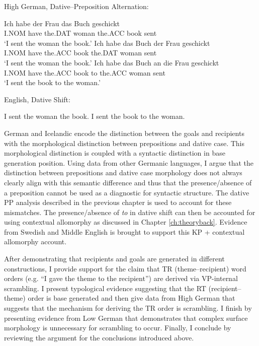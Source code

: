\begin{exe}
	\ex High German, Dative--Preposition Alternation: \label{ex:german-forms}
	\begin{xlist}
		 \ex \label{ex:german-1} \gll Ich habe der Frau das Buch geschickt\\
		 	 I.NOM have the.DAT woman the.ACC book sent\\
			 \trans `I sent the woman the book.'
		 \ex \label{ex:german-2} \gll Ich habe das Buch der Frau geschickt\\
			 I.NOM have the.ACC book the.DAT woman sent\\
			 \trans `I sent the woman the book.'
		 \ex \label{ex:german-3} \gll Ich habe das Buch an die Frau geschickt\\
			 I.NOM have the.ACC book to the.ACC woman sent\\
			 \trans `I sent the book to the woman.'
	\end{xlist}
	 English, Dative Shift:
	\begin{xlist}
		 I sent the woman the book.
		 I sent the book to the woman.
	\end{xlist}
\end{exe}

German and Icelandic encode the distinction between the goals and recipients with the morphological distinction between prepositions and dative case. This morphological distinction is coupled with a syntactic distinction in base generation position. Using data from other Germanic languages, I argue that the distinction between prepositions and dative case morphology does not always clearly align with this semantic difference and thus that the presence/absence of a preposition cannot be used as a diagnostic for syntactic structure. The dative PP analysis described in the previous chapter is used to account for these mismatches. The presence/absence of \textit{to} in dative shift can then be accounted for using contextual allomorphy as discussed in Chapter \ref{ch:theoryback}. Evidence from Swedish and Middle English is brought to support this KP + contextual allomorphy account.

After demonstrating that recipients and goals are generated in different constructions, I provide support for the claim that TR (theme--recipient) word orders (e.g. ``I gave the theme to the recipient'') are derived via VP-internal scrambling. I present typological evidence suggesting that the RT (recipient--theme) order is base generated and then give data from High German that suggests that the mechanism for deriving the TR order is scrambling. I finish by presenting evidence from Low German that demonstrates that complex surface morphology is unnecessary for scrambling to occur. Finally, I conclude by reviewing the argument for the conclusions introduced above.

